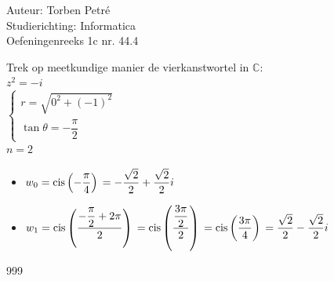 \documentclass[a4paper]{article}
\newcommand{\C}{\mathbb{C}}
\begin{document}
  
\noindent \large Auteur: Torben Petré \\
\noindent \large Studierichting: Informatica\\
\noindent \large Oefeningenreeks 1c nr. 44.4\\

\medskip

\normalsize

Trek op meetkundige manier de vierkanstwortel in $\C$:\\

$z^2 = -i$\\

$\left\{
\begin{array}{l}
  r = \sqrt{0^2 + (-1)^2} \\
  \tan{\theta} = -\dfrac{\pi}{2}
\end{array}
\right.$\\

$n = 2$\\

\begin{itemize}
	\item $w_0 = \operatorname{cis}\left(-\dfrac{\pi}{4}\right)\\
	= -\dfrac{\sqrt{2}}{2}+\dfrac{\sqrt{2}}{2}i$\\
	\item $w_1 = \operatorname{cis}\left(\dfrac{-\dfrac{\pi}{2}+2\pi}{2}\right)\\
	= \operatorname{cis}\left(\dfrac{\dfrac{3\pi}{2}}{2}\right)\\
	= \operatorname{cis}\left(\dfrac{3\pi}{4}\right)\\
	= \dfrac{\sqrt{2}}{2}-\dfrac{\sqrt{2}}{2}i$\\
\end{itemize}

\begin{thebibliography}{999}
\end{thebibliography}
\end{document}
